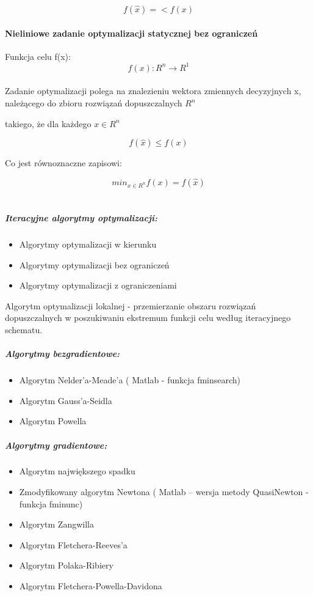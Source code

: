 \documentclass[a4paper,twoside]{report}
\begin{document}
$$f(\hat{x})=<f(x)$$


\paragraph{Nieliniowe zadanie optymalizacji statycznej bez ograniczeń}


Funkcja celu f(x):
$$f(x):R^n \longrightarrow R^1$$
\\
Zadanie optymalizacji polega na znalezieniu wektora zmiennych decyzyjnych x, należącego do zbioru rozwiązań dopuszczalnych $R^n$

takiego, że dla każdego $ x \in R^n $


$$ f(\hat{x})\le f(x) $$

Co jest równoznaczne zapisowi:

$$min_{x \in R^n} f(x) = f(\hat{x})$$
\\
\subparagraph{Iteracyjne algorytmy optymalizacji:}
\begin{itemize}
\item Algorytmy optymalizacji w kierunku
\item Algorytmy optymalizacji bez ograniczeń
\item Algorytmy optymalizacji z ograniczeniami
\end{itemize}
Algorytm optymalizacji lokalnej - przemierzanie obszaru rozwiązań dopuszczalnych w poszukiwaniu ekstremum funkcji celu według iteracyjnego schematu.

\subparagraph{Algorytmy bezgradientowe:}
\begin{itemize}
\item Algorytm Nelder’a-Meade’a ( Matlab - funkcja fminsearch)
\item Algorytm Gauss’a-Seidla
\item Algorytm Powella 
\end{itemize}

\subparagraph{Algorytmy gradientowe:}
\begin{itemize}
\item Algorytm największego spadku
\item Zmodyfikowany algorytm Newtona ( Matlab – wersja metody QuasiNewton
- funkcja fminunc)
\item Algorytm Zangwilla
\item Algorytm Fletchera-Reeves’a
\item Algorytm Polaka-Ribiery
\item Algorytm Fletchera-Powella-Davidona
\end{itemize}
\end{document}
